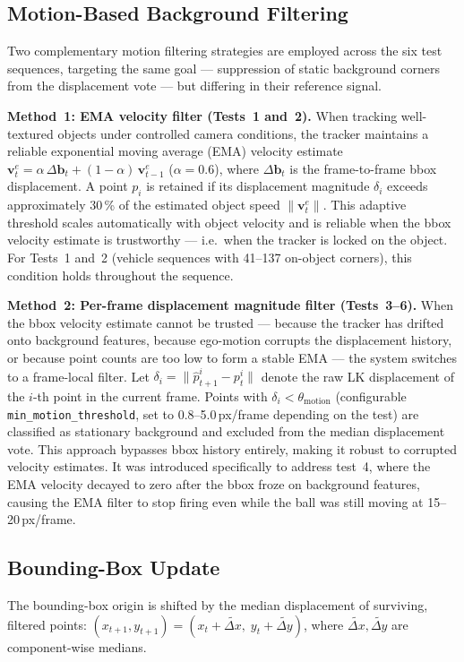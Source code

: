 \documentclass[12pt,a4paper]{article}
\begin{document}
\subsection{Motion-Based Background Filtering}

Two complementary motion filtering strategies are employed across the six test sequences,
targeting the same goal --- suppression of static background corners from the displacement vote
--- but differing in their reference signal.

\textbf{Method~1: EMA velocity filter (Tests~1 and~2).}
When tracking well-textured objects under controlled camera conditions, the tracker maintains
a reliable exponential moving average (EMA) velocity estimate
$\mathbf{v}^e_t = \alpha\,\Delta\mathbf{b}_t + (1-\alpha)\,\mathbf{v}^e_{t-1}$
($\alpha = 0.6$), where $\Delta\mathbf{b}_t$ is the frame-to-frame bbox displacement.
A point $p_i$ is retained if its displacement magnitude $\delta_i$ exceeds approximately
30\,\% of the estimated object speed $\|\mathbf{v}^e_t\|$.
This adaptive threshold scales automatically with object velocity and is reliable when the
bbox velocity estimate is trustworthy --- i.e.\ when the tracker is locked on the object.
For Tests~1 and~2 (vehicle sequences with 41--137 on-object corners), this condition holds
throughout the sequence.

\textbf{Method~2: Per-frame displacement magnitude filter (Tests~3--6).}
When the bbox velocity estimate cannot be trusted --- because the tracker has drifted onto
background features, because ego-motion corrupts the displacement history, or because point
counts are too low to form a stable EMA --- the system switches to a frame-local filter.
Let $\delta_i = \|\hat{p}^i_{t+1} - p^i_t\|$ denote the raw LK displacement of the
$i$-th point in the current frame. Points with $\delta_i < \theta_{\text{motion}}$
(configurable \texttt{min\_motion\_threshold}, set to 0.8--5.0\,px/frame depending on the
test) are classified as stationary background and excluded from the median displacement vote.
This approach bypasses bbox history entirely, making it robust to corrupted velocity estimates.
It was introduced specifically to address test~4, where the EMA velocity decayed to zero
after the bbox froze on background features, causing the EMA filter to stop firing even while
the ball was still moving at 15--20\,px/frame.

\subsection{Bounding-Box Update}
The bounding-box origin is shifted by the median displacement of surviving, filtered points:
$(x_{t+1}, y_{t+1}) = (x_t + \tilde{\Delta x},\; y_t + \tilde{\Delta y})$,
where $\tilde{\Delta x}, \tilde{\Delta y}$ are component-wise medians.
\end{document}
